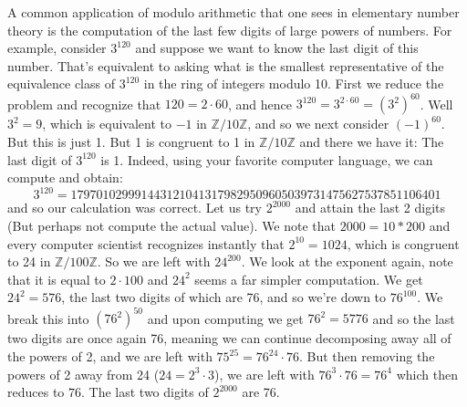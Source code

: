 \documentclass{article}                                                        %
\begin{document}
            \begin{example}
                A common application of modulo arithmetic that one sees in
                elementary number theory is the computation of the last few
                digits of large powers of numbers. For example, consider $3^120$
                and suppose we want to know the last digit of this number.
                That's equivalent to asking what is the smallest representative
                of the equivalence class of $3^{120}$ in the ring of integers
                modulo 10. First we reduce the problem and recognize that
                $120=2\cdot{60}$, and hence
                $3^{120}=3^{2\cdot{60}}=(3^{2})^{60}$. Well $3^{2}=9$, which
                is equivalent to $\minus{1}$ in $\mathbb{Z}/10\mathbb{Z}$, and
                so we next consider $(\minus{1})^{60}$. But this is just 1.
                But 1 is congruent to 1 in $\mathbb{Z}/10\mathbb{Z}$ and there
                we have it: The last digit of $3^{120}$ is 1. Indeed, using your
                favorite computer language, we can compute and obtain:
                \begin{equation*}
                    3^{120}=
                    1797010299914431210413179829509605039731475627537851106401
                \end{equation*}
                and so our calculation was correct. Let us try $2^{2000}$ and
                attain the last 2 digits (But perhaps not compute the actual
                value). We note that $2000=10*200$ and every computer scientist
                recognizes instantly that $2^{10}=1024$, which is congruent to
                24 in $\mathbb{Z}/100\mathbb{Z}$. So we are left with
                $24^{200}$. We look at the exponent again, note that it is equal
                to $2\cdot{100}$ and $24^{2}$ seems a far simpler computation.
                We get $24^{2}=576$, the last two digits of which are 76, and so
                we're down to $76^{100}$. We break this into $(76^{2})^{50}$ and
                upon computing we get $76^{2}=5776$ and so the last two digits
                are once again 76, meaning we can continue decomposing away all
                of the powers of 2, and we are left with
                $75^{25}=76^{24}\cdot{76}$. But then removing the powers of 2
                away from 24 ($24=2^{3}\cdot{3}$), we are left with
                $76^{3}\cdot{76}=76^{4}$ which then reduces to $76$. The last
                two digits of $2^{2000}$ are 76.
            \end{example}
\end{document}

